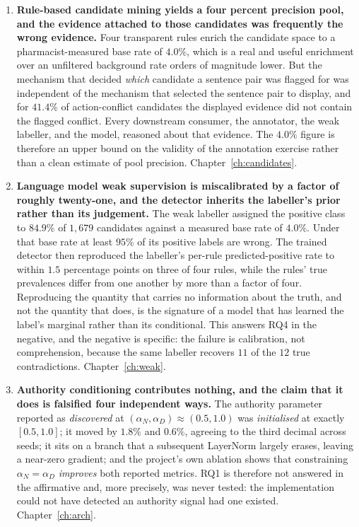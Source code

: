 \begin{enumerate}
\item \textbf{Rule-based candidate mining yields a four percent precision pool,
      and the evidence attached to those candidates was frequently the wrong
      evidence.} Four transparent rules enrich the candidate space to a
      pharmacist-measured base rate of $4.0\%$, which is a real and useful
      enrichment over an unfiltered background rate orders of magnitude lower.
      But the mechanism that decided \emph{which} candidate a sentence pair was
      flagged for was independent of the mechanism that selected the sentence
      pair to display, and for $41.4\%$ of action-conflict candidates the
      displayed evidence did not contain the flagged conflict. Every downstream
      consumer, the annotator, the weak labeller, and the model, reasoned about
      that evidence. The $4.0\%$ figure is therefore an upper bound on the
      validity of the annotation exercise rather than a clean estimate of pool
      precision. Chapter~\ref{ch:candidates}.

\item \textbf{Language model weak supervision is miscalibrated by a factor of
      roughly twenty-one, and the detector inherits the labeller's prior rather
      than its judgement.} The weak labeller assigned the positive class to
      $84.9\%$ of $1{,}679$ candidates against a measured base rate of $4.0\%$.
      Under that base rate at least $95\%$ of its positive labels are wrong. The
      trained detector then reproduced the labeller's per-rule
      predicted-positive rate to within $1.5$ percentage points on three of four
      rules, while the rules' true prevalences differ from one another by more
      than a factor of four. Reproducing the quantity that carries no
      information about the truth, and not the quantity that does, is the
      signature of a model that has learned the label's marginal rather than its
      conditional. This answers RQ4 in the negative, and the negative is
      specific: the failure is calibration, not comprehension, because the same
      labeller recovers $11$ of the $12$ true contradictions.
      Chapter~\ref{ch:weak}.

\item \textbf{Authority conditioning contributes nothing, and the claim that it
      does is falsified four independent ways.} The authority parameter reported
      as \emph{discovered} at $(\alpha_N, \alpha_D) \approx (0.5, 1.0)$ was
      \emph{initialised} at exactly $[0.5, 1.0]$; it moved by $1.8\%$ and
      $0.6\%$, agreeing to the third decimal across seeds; it sits on a branch
      that a subsequent LayerNorm largely erases, leaving a near-zero gradient;
      and the project's own ablation shows that constraining
      $\alpha_N = \alpha_D$ \emph{improves} both reported metrics. RQ1 is
      therefore not answered in the affirmative and, more precisely, was never
      tested: the implementation could not have detected an authority signal had
      one existed. Chapter~\ref{ch:arch}.


\end{enumerate}
